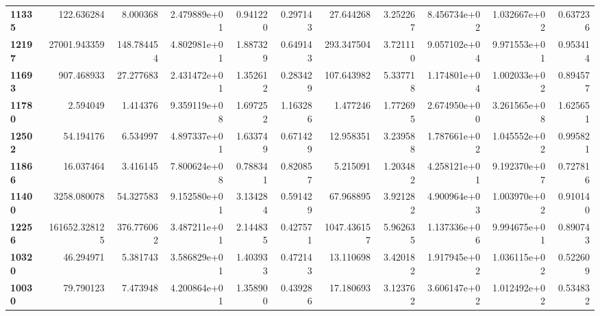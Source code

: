 \begin{table}[h]
\begin{tabular}{lrrrrrrrrrr}
\textbf{11335} &     122.636284 &        8.000368 &               2.479889e+01 &  0.941220 &  0.297143 &    27.644268 &   3.252267 &  8.456734e+02 &  1.032667e+02 &     0.637236 \\
\textbf{12197} &   27001.943359 &      148.784454 &               4.802981e+01 &  1.887329 &  0.649143 &   293.347504 &   3.721110 &  9.057102e+04 &  9.971553e+01 &     0.953414 \\
\textbf{11693} &     907.468933 &       27.277683 &               2.431472e+01 &  1.352612 &  0.283429 &   107.643982 &   5.337718 &  1.174801e+04 &  1.002033e+02 &     0.894577 \\
\textbf{11780} &       2.594049 &        1.414376 &               9.359119e+08 &  1.697252 &  1.163286 &     1.477246 &   1.772695 &  2.674950e+00 &  3.261565e+08 &     1.625651 \\
\textbf{12502} &      54.194176 &        6.534997 &               4.897337e+01 &  1.633749 &  0.671429 &    12.958351 &   3.239588 &  1.787661e+02 &  1.045552e+02 &     0.995821 \\
\textbf{11866} &      16.037464 &        3.416145 &               7.800624e+08 &  0.788341 &  0.820857 &     5.215091 &   1.203482 &  4.258121e+01 &  9.192370e+07 &     0.727816 \\
\textbf{11400} &    3258.080078 &       54.327583 &               9.152580e+01 &  3.134284 &  0.591429 &    67.968895 &   3.921282 &  4.900964e+03 &  1.003970e+02 &     0.910140 \\
\textbf{12256} &  161652.328125 &      376.776062 &               3.487211e+01 &  2.144835 &  0.427571 &  1047.436157 &   5.962635 &  1.137336e+06 &  9.994675e+01 &     0.890743 \\
\textbf{10320} &      46.294971 &        5.381743 &               3.586829e+01 &  1.403933 &  0.472143 &    13.110698 &   3.420182 &  1.917945e+02 &  1.036115e+02 &     0.522609 \\
\textbf{10030} &      79.790123 &        7.473948 &               4.200864e+01 &  1.358900 &  0.439286 &    17.180693 &   3.123762 &  3.606147e+02 &  1.012492e+02 &     0.534832 \\
\bottomrule
\end{tabular}
\end{table}
